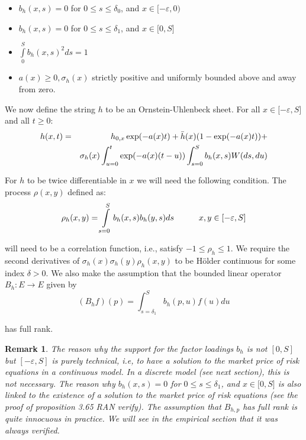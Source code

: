 \documentclass{article}
\newtheorem{remark}{Remark}
\begin{document}
\begin{itemize}
\item $b_{h}(x,s)=0$ for $0\leq s\leq \delta _{0}$, and $x\in \lbrack
-\varepsilon ,0)$

\item $b_{h}(x,s)=0$ for $0\leq s\leq \delta _{1}$, and $x\in \lbrack 0,S]$

\item $\int\limits_{0}^{S}b_{h}(x,s)^{2}ds=1$

\item $a(x)\geq 0,\sigma _{h}(x)$ strictly positive and uniformly bounded
above and away from zero.
\end{itemize}

We now define the string $h$ to be an Ornstein-Uhlenbeck sheet. For all $%
x\in \lbrack -\varepsilon ,S]$ and all $t\geq 0$:%
\begin{eqnarray} \label{equ_h_A}
h(x,t) &=&h_{0,x}\exp (-a(x)t)+\bar{h}(x)(1-\exp (-a(x)t))+  
\\
&&\sigma _{h}(x)\int_{u=0}^{t}\exp
(-a(x)(t-u))\int_{s=0}^{S}b_{h}(x,s)W(ds,du)  \notag
\end{eqnarray}

For $h$ to be twice differentiable in $x$ we will need the following
condition. The process $\rho (x,y)$ defined as:%
\begin{equation}
\rho _{h}(x,y)=\int\limits_{s=0}^{S}b_{h}(x,s)b_{h}(y,s)ds\text{ \ \ \ \ \ \
}x,y\in \lbrack -\varepsilon ,S]  \label{rho_h}
\end{equation}%
\bigskip

will need to be a correlation function, i.e., satisfy $-1\leq \rho _{h}\leq 1
$. We require the second derivatives of $\sigma _{h}(x)\sigma _{h}(y)\rho
_{h}(x,y)$ to be H\"{o}lder continuous for some index $\delta >0$. We also
make the assumption that the bounded linear operator $B_{h}:E\rightarrow E$
given by%
\begin{equation*}
(B_{h}f)(p)=\int_{s=\delta _{1}}^{S}b_{h}(p,u)f(u)du
\end{equation*}%
\bigskip

has full rank.

\bigskip


\begin{remark}
The reason why the support for the factor loadings $b_{h}$ is not $[0,S]$
but $[-\varepsilon ,S]$ is purely technical, i.e, to have a solution to the
market price of risk equations in a continuous model. In a discrete model
(see next section), this is not necessary. The reason why $b_{h}(x,s)=0$ for
$0\leq s\leq \delta _{1}$, and $x\in \lbrack 0,S]$ is also linked to the
existence of a solution to the market price of risk equations (see the proof
of proposition 3.65 RAN verify). The assumption that $B_{h,p}$ has full rank
is quite innocuous in practice. We will see in the empirical section that it
was always verified.\bigskip
\end{remark}
\end{document}
